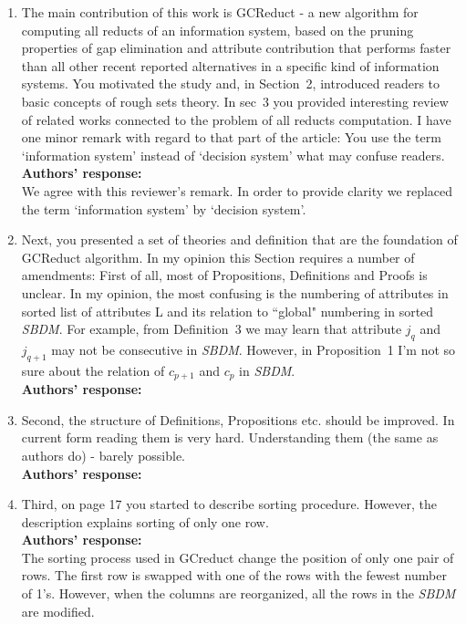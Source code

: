 \documentclass{letter}
\begin{document}
\begin{letter}{}
 \begin{enumerate}  
	\item The main contribution of this work is GCReduct - a new algorithm for computing all reducts of an information system, based on the pruning properties of gap elimination and attribute contribution that performs faster than all other recent reported alternatives in a specific kind of information systems. You motivated the study and, in Section~2, introduced readers to basic concepts of rough sets theory. In sec~3 you provided interesting review of related works connected to the problem of all reducts computation. I have one minor remark with regard to that part of the article: You use the term `information system' instead of `decision system' what may confuse readers.\\
	\textbf{Authors’ response:} \\
	We agree with this reviewer's remark. In order to provide clarity we replaced the term `information system' by `decision system'.
	
	\item Next, you presented a set of theories and definition that are the foundation of GCReduct algorithm. In my opinion this Section requires a number of amendments:
	First of all, most of Propositions, Definitions and Proofs is unclear. In my opinion, the most confusing is the numbering of attributes in sorted list of attributes L and its relation to ``global" numbering in sorted \textit{SBDM}.  For example, from Definition~3 we may learn that attribute $j_{q}$ and $j_{q+1}$ may not be consecutive in \textit{SBDM}. However, in Proposition~1 I'm not so sure about the relation of $c_{p+1}$ and $c_{p}$ in \textit{SBDM}.\\
	\textbf{Authors’ response:}\\
	
	\item Second, the structure of  Definitions, Propositions etc. should be improved. In current form reading them is very hard. Understanding them (the same as authors do) - barely possible.\\
	\textbf{Authors’ response:}\\
	
	\item Third, on page 17 you started to describe sorting procedure. However, the description explains sorting of only one row.\\
	\textbf{Authors’ response:}\\
	The sorting process used in GCreduct change the position of only one pair of rows. The first row is swapped with one of the rows with the fewest number of 1's. However, when the columns are reorganized, all the rows in the \textit{SBDM} are modified.
	

\end{enumerate}
\end{letter}
\end{document}
